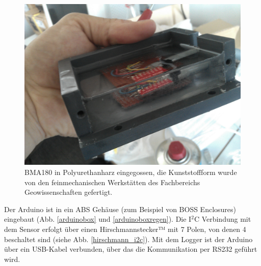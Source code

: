 \documentclass[12pt,a4paper,twoside,BCOR=12.5mm]{scrartcl}
\begin{document}
\begin{figure}[H]
\centering
\includegraphics[scale=.14]{hardwareimages/harz.jpg}
\caption{BMA180 in Polyurethanharz eingegossen, die Kunststoffform wurde von den feinmechanischen Werkstätten des Fachbereichs Geowissenschaften gefertigt.}
\label{harz}
\end{figure}

Der Arduino ist in ein ABS Gehäuse (zum Beispiel von BOSS Enclosures) eingebaut (Abb. \ref{arduinobox} und \ref{arduinoboxregen}).
Die I$^2$C Verbindung mit dem Sensor erfolgt über einen Hirsch\-mann\-steck\-er™ mit 7 Polen, von denen 4 beschaltet sind  (siehe Abb. \ref{hirschmann_i2c}).
Mit dem Logger ist der Arduino über ein USB-Kabel verbunden, über das die Kommunikation per RS232 geführt wird.
\end{document}
